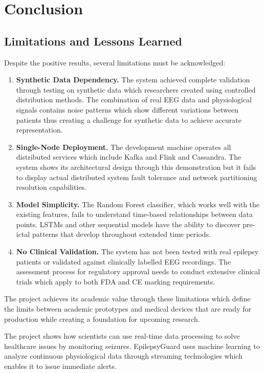 \documentclass[12pt, a4paper, oneside]{report}
\newcommand{\chapterpage}[2]{%
    \cleardoublepage
    \thispagestyle{empty}
    \vspace*{\fill}
    \begin{center}
        \huge \textbf{Chapter #1} \\
        \vspace{1cm}
        \Huge #2
    \end{center}
    \vspace*{\fill}
    \newpage
}
\begin{document}
\chapter{Conclusion}

\section{Limitations and Lessons Learned}
Despite the positive results, several limitations must be acknowledged:

\begin{enumerate}
    \item \textbf{Synthetic Data Dependency.} The system achieved complete validation through testing on synthetic data which researchers created using controlled distribution methods. The combination of real EEG data and physiological signals contains noise patterns which show different variations between patients thus creating a challenge for synthetic data to achieve accurate representation.
    \item \textbf{Single-Node Deployment.} The development machine operates all distributed services which include Kafka and Flink and Cassandra. The system shows its architectural design through this demonstration but it fails to display actual distributed system fault tolerance and network partitioning resolution capabilities.
    \item \textbf{Model Simplicity.} The Random Forest classifier, which works well with the existing features, fails to understand time-based relationships between data points. LSTMs and other sequential models have the ability to discover pre-ictal patterns that develop throughout extended time periods.
    \item \textbf{No Clinical Validation.} The system has not been tested with real epilepsy patients or validated against clinically labelled EEG recordings. The assessment process for regulatory approval needs to conduct extensive clinical trials which apply to both FDA and CE marking requirements.
\end{enumerate}

The project achieves its academic value through these limitations which define the limits between academic prototypes and medical devices that are ready for production while creating a foundation for upcoming research.

The project shows how scientists can use real-time data processing to solve healthcare issues by monitoring seizures. EpilepsyGuard uses machine learning to analyze continuous physiological data through streaming technologies which enables it to issue immediate alerts.
\end{document}
